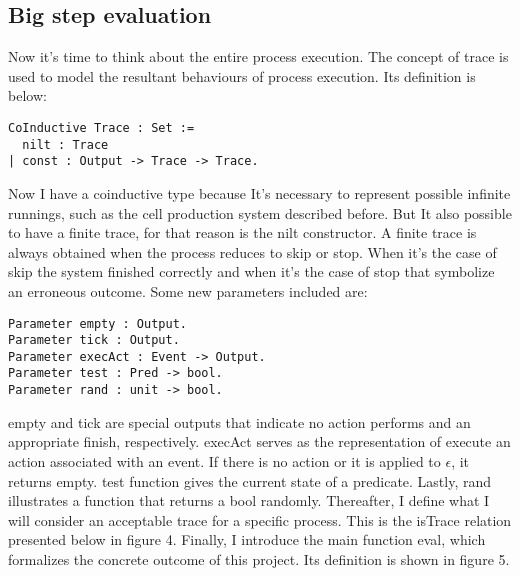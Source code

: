 \documentclass{comjnl}
\begin{document}
\subsection{Big step evaluation}
Now it's time to think about the entire process execution. The concept of trace is used to model the resultant behaviours of process execution. Its definition is below:
\begin{verbatim}
CoInductive Trace : Set :=
  nilt : Trace
| const : Output -> Trace -> Trace.
\end{verbatim}
Now I have a coinductive type because It's necessary to represent possible infinite runnings, such as the cell production system described before. But It also possible to have a finite trace, for that reason is the nilt constructor. A finite trace is always obtained when the process reduces to skip or stop. When it's the case of skip the system finished correctly and when it's the case of stop that symbolize an erroneous outcome.
Some new parameters included are:
\begin{verbatim}
Parameter empty : Output.
Parameter tick : Output.
Parameter execAct : Event -> Output.
Parameter test : Pred -> bool.
Parameter rand : unit -> bool.
\end{verbatim}
empty and tick are special outputs that indicate no action performs and an appropriate finish, respectively. execAct serves as the representation of execute an action associated with an event. If there is no action or it is applied to $\epsilon$, it returns empty. test function gives the current state of a predicate. Lastly, rand illustrates a function that returns a bool randomly.
Thereafter, I define what I will consider an acceptable trace for a specific process. This is the isTrace relation presented below in figure 4.
Finally, I introduce the main function eval, which formalizes the concrete outcome of this project. Its definition is shown in figure 5.
\end{document}
